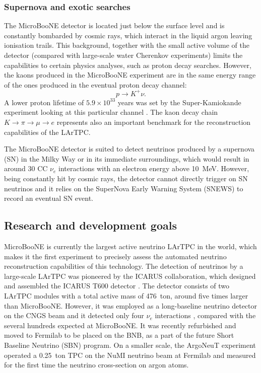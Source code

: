 \subsubsection{Supernova and exotic searches}
The MicroBooNE detector is located just below the surface level and is constantly bombarded by cosmic rays, which interact in the liquid argon leaving ionisation trails. This background, together with the small active volume of the detector (compared with large-scale water Cherenkov experiments) limits the capabilities to certain physics analyses, such as proton decay searches. However, the kaons produced in the MicroBooNE experiment are in the same energy range of the ones produced in the eventual proton decay channel:
\begin{equation}
    p\to K^+\nu.
\end{equation}
A lower proton lifetime of $5.9\times10^{33}$ years was set by the Super-Kamiokande experiment looking at this particular channel \cite{Abe:2014mwa}. The kaon decay chain $K\rightarrow\pi\rightarrow\mu\rightarrow e$ represents also an important benchmark for the reconstruction capabilities of the LArTPC.

The MicroBooNE detector is suited to detect neutrinos produced by a supernova (SN) in the Milky Way or in its immediate surroundings, which would result in around 30 CC $\nu_e$ interactions with an electron energy above 10~MeV. However, being constantly hit by cosmic rays, the detector cannot directly trigger on SN neutrinos and it relies on the SuperNova Early Warning System (SNEWS) to record an eventual SN event. 


\subsection{Research and development goals}
MicroBooNE is currently the largest active neutrino LArTPC in the world, which makes it the first experiment to precisely assess the automated neutrino reconstruction capabilities of this technology. The detection of neutrinos by a large-scale LArTPC was pioneered by the ICARUS collaboration, which designed and assembled the ICARUS T600 detector \cite{Amerio:2004ze}. The detector consists of two LArTPC modules with a total active mass of 476~ton, around five times larger than MicroBooNE. However, it was employed as a long-baseline neutrino detector on the CNGS beam and it detected only four $\nu_e$ interactions \cite{Antonello:2013gut}, compared with the several hundreds expected at MicroBooNE. It was recently refurbished and moved to Fermilab to be placed on the BNB, as a part of the future Short Baseline Neutrino (SBN) program. On a smaller scale, the ArgoNeuT experiment operated a 0.25~ton TPC on the NuMI neutrino beam at Fermilab \cite{Anderson:2012vc} and measured for the first time the neutrino cross-section on argon atoms.

